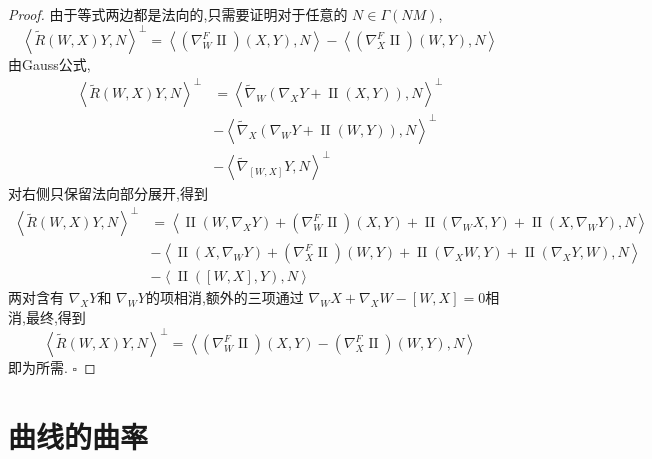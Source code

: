 \documentclass[../../几何与拓扑.tex]{subfiles}
\begin{document}
\begin{proof}
    由于等式两边都是法向的,只需要证明对于任意的 \(  N \in  \Gamma \left( NM \right)   \), \[
    \left<\widetilde{R}\left( W,X \right)Y,N  \right>^{\perp}= \left<\left(  \nabla _{W}^{F} \operatorname{II} \right)\left( X,Y \right),N   \right>-\left<\left(  \nabla _{X}^{F}\operatorname{II}  \right)\left( W,Y \right),N   \right>
    \]  由Gauss公式,  \[
   \begin{aligned}
    \left<\tilde{R}\left( W,X \right)Y,N  \right>^{\perp}& = \left<  \tilde{\nabla} _{W}\left(  \nabla _{X}Y+ \operatorname{II} \left( X,Y \right)  \right),N  \right>^{\perp}\\ 
     & -\left< \tilde{\nabla} _{X}\left(  \nabla _{W}Y+ \operatorname{II} \left( W,Y \right)  \right),N  \right>^{\perp}\\ 
      & - \left< \tilde{\nabla} _{\left[ W,X \right] } Y,N\right> ^{\perp}
   \end{aligned}
    \]对右侧只保留法向部分展开,得到 \[
   \begin{aligned}
    \left<\tilde{R}\left( W,X \right)Y,N  \right>^{\perp}& = \left<\operatorname{II} \left( W,  \nabla _XY \right)+ \left(  \nabla _{W}^{F} \operatorname{II} \right)\left( X,Y \right)+\operatorname{II} \left(  \nabla _{W}X,Y \right)+ \operatorname{II} \left( X, \nabla _{W}Y \right)   ,N   \right> \\ 
     & -\left<\operatorname{II} \left( X, \nabla _{W}Y \right)+ \left(  \nabla _{X}^{F}\operatorname{II}  \right)\left( W,Y \right) + \operatorname{II} \left(  \nabla _{X}W,Y \right)+ \operatorname{II} \left(  \nabla _{X}Y,W \right),N      \right>\\ 
      &-\left<\operatorname{II} \left( \left[ W,X \right],Y  \right)  ,N\right>
   \end{aligned}
    \]两对含有 \(   \nabla _{X}Y  \)和 \(   \nabla _{W}Y  \)的项相消,额外的三项通过 \(   \nabla _{W}X+  \nabla _{X}W-\left[ W,X \right]= 0   \)相消,最终,得到 \[
    \left<\tilde{R}\left( W,X \right)Y,N  \right>^{\perp}= \left<\left(  \nabla _{W}^{F}\operatorname{II}  \right)\left( X,Y \right)- \left(  \nabla _{X}^{F}\operatorname{II}  \right)\left( W,Y \right) ,N    \right>
    \]   即为所需.
    \hfill $\square$
\end{proof}

\section{曲线的曲率}
\end{document}

